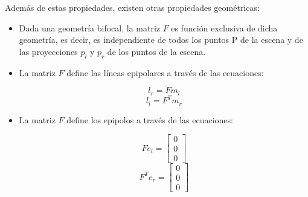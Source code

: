 Además de estas propiedades, existen otras propiedades geométricas:

\begin{itemize}
\item Dada una geometría bifocal, la matriz $F$ es función exclusiva de dicha geometría, es decir, es independiente de todos los puntos P de la escena y de las proyecciones $p_l$ y $p_r$ de los puntos de la escena.
\item La matriz $F$ define las líneas epipolares a través de las ecuaciones:

  \begin{equation}
    l_r=Fm_l
  \end{equation}
  \begin{equation}
    l_l=F^Tm_r
  \end{equation}

\item La matriz $F$ define los epipolos a través de las ecuaciones:

  \begin{equation}
    Fe_l=
    \begin{bmatrix}
      0 \\ 0 \\ 0
    \end{bmatrix}
  \end{equation}
  \begin{equation}
    F^Te_r=
    \begin{bmatrix}
      0 \\ 0 \\ 0
    \end{bmatrix}
  \end{equation}

\end{itemize}






















